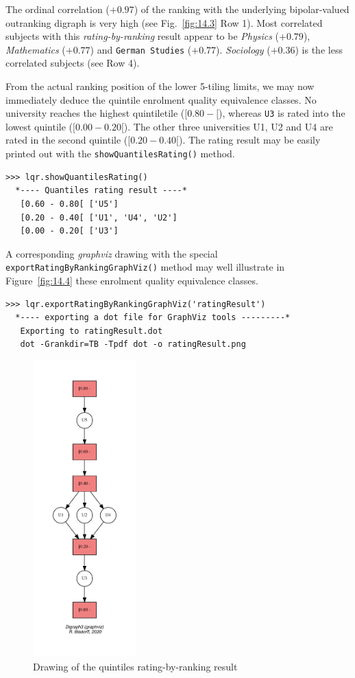 The ordinal correlation ($+0.97$) of the \Copeland ranking with the underlying bipolar-valued outranking digraph is very high (see Fig.~\vref{fig:14.3} Row 1). Most correlated subjects with this \emph{rating-by-ranking} result appear to be \emph{Physics} ($+0.79$), \emph{Mathematics} ($+0.77$) and \texttt{German Studies} ($+0.77$). \emph{Sociology} ($+0.36$) is the less correlated subjects (see Row 4).

From the actual ranking position of the lower 5-tiling limits, we may now immediately deduce the quintile enrolment quality equivalence classes. No university reaches the highest quintiletile ($[0.80 - [$), whereas \texttt{U3} is rated into the lowest quintile ($[0.00- 0.20[$). The other three universities U1, U2 and U4 are rated in the second quintile ($[0.20- 0.40[$). The rating result may be easily printed out with the \texttt{showQuantilesRating()} method.
\begin{lstlisting}[caption={Showing the quintiling of the enrolment quality of the 5 Universities},label=list:14.3]
>>> lqr.showQuantilesRating()
  *---- Quantiles rating result ----*
   [0.60 - 0.80[ ['U5']
   [0.20 - 0.40[ ['U1', 'U4', 'U2']
   [0.00 - 0.20[ ['U3']
\end{lstlisting}

A corresponding \emph{graphviz} drawing with the special \texttt{exportRatingByRan\-kingGraphViz()} method may well illustrate in Figure~\vref{fig:14.4} these enrolment quality equivalence classes.
\begin{lstlisting}
>>> lqr.exportRatingByRankingGraphViz('ratingResult')
  *---- exporting a dot file for GraphViz tools ---------*
   Exporting to ratingResult.dot
   dot -Grankdir=TB -Tpdf dot -o ratingResult.png
\end{lstlisting}
\begin{figure}[ht]
\sidecaption[t]
\includegraphics[width=4cm]{Figures/14-4-ratingResult.pdf}
\caption{Drawing of the quintiles rating-by-ranking result}
\label{fig:14.4}       %
\end{figure}

